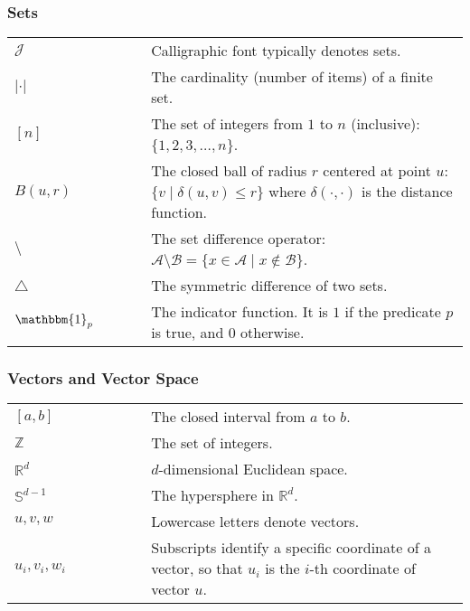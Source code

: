 \subsubsection*{Sets}
\begin{longtable*}{p{0.3\linewidth}p{0.7\linewidth}}
$\mathcal{J}$ & Calligraphic font typically denotes sets. \\
$\lvert \cdot \rvert$ & The cardinality (number of items) of a finite set. \\
$[n]$ & The set of integers from $1$ to $n$ (inclusive): $\{ 1, 2, 3, \ldots, n\}$. \\
$B(u, r)$ & The closed ball of radius $r$ centered at point $u$: $\{ v \;|\; \delta(u, v) \leq r \}$ where
$\delta(\cdot, \cdot)$ is the distance function.\\
$\setminus$ & The set difference operator: $\mathcal{A} \setminus \mathcal{B} = \{ x \in \mathcal{A} \;|\; x \notin \mathcal{B} \}$. \\
$\triangle$ & The symmetric difference of two sets. \\
$\mathbbm{1}_p$ & The indicator function. It is $1$ if the predicate $p$ is true, and $0$ otherwise. \\
\end{longtable*}

\subsubsection*{Vectors and Vector Space}
\begin{longtable*}{p{0.3\linewidth}p{0.7\linewidth}}
$[a, b]$ & The closed interval from $a$ to $b$. \\
$\mathbb{Z}$ & The set of integers. \\
$\mathbb{R}^d$ & $d$-dimensional Euclidean space. \\
$\mathbb{S}^{d-1}$ & The hypersphere in $\mathbb{R}^d$. \\
$u, v, w$ & Lowercase letters denote vectors. \\
$u_i, v_i, w_i$ & Subscripts identify a specific coordinate of a vector, so that $u_i$ is the $i$-th coordinate of vector $u$. \\
\end{longtable*}

